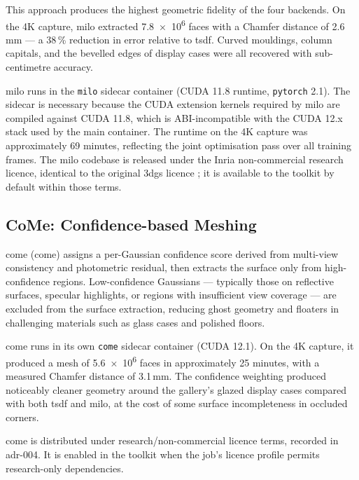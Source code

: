This approach produces the highest geometric fidelity of the four backends. On the 4K capture, \acrshort{milo} extracted \num{7.8e6} faces with a Chamfer distance of \num{2.6}\,mm --- a 38\,\% reduction in error relative to \acrshort{tsdf}. Curved mouldings, column capitals, and the bevelled edges of display cases were all recovered with sub-centimetre accuracy.

\acrshort{milo} runs in the \texttt{milo} sidecar container (CUDA 11.8 runtime, \texttt{pytorch} 2.1). The sidecar is necessary because the CUDA extension kernels required by \acrshort{milo} are compiled against CUDA 11.8, which is ABI-incompatible with the CUDA 12.x stack used by the main container. The runtime on the 4K capture was approximately 69 minutes, reflecting the joint optimisation pass over all training frames. The \acrshort{milo} codebase is released under the Inria non-commercial research licence, identical to the original \acrshort{3dgs} licence \parencite{Kerbl2023}; it is available to the toolkit by default within those terms.

\subsection{CoMe: Confidence-based Meshing}
\label{sec:come}

\acrlong{come} (\acrshort{come}) \parencite{Radl2025CoMe} assigns a per-Gaussian confidence score derived from multi-view consistency and photometric residual, then extracts the surface only from high-confidence regions. Low-confidence Gaussians --- typically those on reflective surfaces, specular highlights, or regions with insufficient view coverage --- are excluded from the surface extraction, reducing ghost geometry and floaters in challenging materials such as glass cases and polished floors.

\acrshort{come} runs in its own \texttt{come} sidecar container (CUDA 12.1). On the 4K capture, it produced a mesh of \num{5.6e6} faces in approximately 25 minutes, with a measured Chamfer distance of \num{3.1}\,mm. The confidence weighting produced noticeably cleaner geometry around the gallery's glazed display cases compared with both \acrshort{tsdf} and \acrshort{milo}, at the cost of some surface incompleteness in occluded corners.

\acrshort{come} is distributed under research/non-commercial licence terms, recorded in \acrshort{adr}-004. It is enabled in the toolkit when the job's licence profile permits research-only dependencies.

